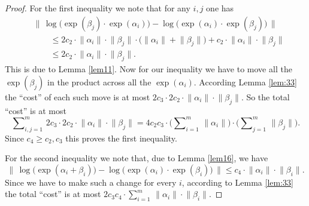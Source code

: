 \documentclass[10pt, a4paper]{amsart}
\theoremstyle{definition}
\numberwithin{equation}{section}
\newcommand{\norm}[1]{\lVert #1 \rVert}
\newcommand{\Norm}[1]{\bigl\lVert\, #1 \, \bigr\rVert}
\begin{document}
\begin{proof}
For the first inequality we note that for any $i,j$ one has
\[ \begin{aligned}
& \Norm{ \log \bigl( \exp(\beta_j) \cdot \exp(\alpha_i) \bigr) - 
\log \bigl( \exp(\alpha_i) \cdot \exp(\beta_j) \bigr) } \\
& \qquad \leq 2 c_2 \cdot \norm{\alpha_i} \cdot \norm{\beta_j} \cdot
\bigl( \norm{\alpha_i} + \norm{\beta_j} \bigr) +
c_2 \cdot \norm{\alpha_i} \cdot \norm{\beta_j} \\
& \qquad \leq 2 c_2 \cdot \norm{\alpha_i} \cdot \norm{\beta_j} .
\end{aligned} \]
This is due to Lemma \ref{lem11}.
Now for our inequality we have to move all the $\exp(\beta_j)$ in the
product across all the $\exp(\alpha_i)$. According Lemma \ref{lem:33} the
``cost'' of each such move is at most
$2 c_3 \cdot 2 c_2 \cdot \norm{\alpha_i} \cdot \norm{\beta_j}$.
So the total ``cost'' is at most
\[ \sum\nolimits_{i, j = 1}^m\, 2 c_3 \cdot 
2 c_2 \cdot \norm{\alpha_i} \cdot \norm{\beta_j} =
4 c_2 c_3 \cdot 
\bigl( \sum\nolimits_{i = 1}^m\, \norm{\alpha_i} \bigr) \cdot  
\bigl( \sum\nolimits_{j = 1}^m\, \norm{\beta_j} \bigr) . \]
Since $c_4 \geq c_2, c_3$ this proves the first inequality.

For the second inequality we note that, due to Lemma \ref{lem16}, we
have
\[ \Norm{ \log \bigl( \exp(\alpha_i + \beta_i) \bigr) -
\log \bigl( \exp(\alpha_i) \cdot \exp(\beta_i) \bigr) } 
\leq c_4 \cdot \norm{\alpha_i} \cdot \norm{\beta_i}  . \]
Since we have to make such a change for every $i$, according to
Lemma \ref{lem:33} the total ``cost'' is at most
$2 c_3 c_4 \cdot \sum\nolimits_{i = 1}^m\, 
\norm{\alpha_i} \cdot \norm{\beta_i}$.
\end{proof}
\end{document}
